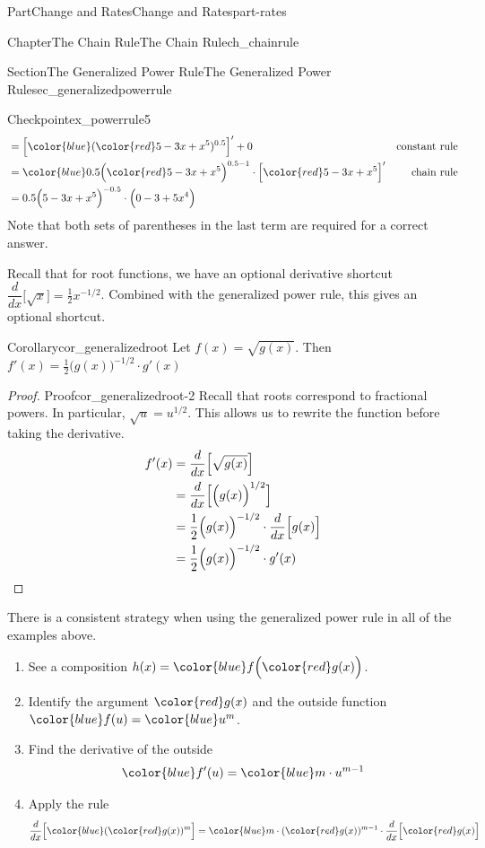\documentclass{tufte-book}
\numberwithin{equation}{chapter}
\newcommand{\qedhere}{\relax}
\newcommand{\red}[1]{   {\color{red}   #1}   }
\newcommand{\blue}[1]{  {\color{blue}  #1}  }
\newcommand{\ddx}[1]{ \dfrac{d}{dx} \Big[ #1 \Big]  }
\newcommand{\D}[1]{ \Big[ #1 \Big]'  }
\newcommand{\amp}{&}
\begin{document}
\begin{partptx}{Part}{Change and Rates}{}{Change and Rates}{}{}{part-rates}
\begin{chapterptx}{Chapter}{The Chain Rule}{}{The Chain Rule}{}{}{ch_chainrule}
\begin{sectionptx}{Section}{The Generalized Power Rule}{}{The Generalized Power Rule}{}{}{sec_generalizedpowerrule}
\begin{inlineexercise}{Checkpoint}{}{ex_powerrule5}
\begin{align*}
\amp =  \D{ \blue{(\red{5-3x+x^5})^{0.5}} }  + 0 \amp \text{constant  rule} \\
\amp = \blue{0.5 \Big(\red{5-3x+x^5}\Big)^{0.5-1}}\cdot\D{\red{5-3x+x^5}} \amp \text{chain rule} \\
\amp = 0.5 \Big( 5-3x+x^5 \Big)^{-0.5}\cdot\Big( 0-3+5x^4\Big) 
\end{align*}
Note that both sets of parentheses in the last term are required for a correct answer.%
\end{inlineexercise}%
Recall that for root functions, we have an optional derivative shortcut \(\ddx{\sqrt{x}}=\frac{1}{2}x^{-1/2}\).  Combined with the generalized power rule, this gives an optional shortcut.%
\begin{corollary}{Corollary}{}{}{cor_generalizedroot}%
Let \(f(x) = \sqrt{g(x)}\). Then \(f'(x) = \frac{1}{2} \Big(g(x)\Big)^{-1/2}\cdot g'(x)\)%
\end{corollary}
\begin{proof}{Proof}{}{cor_generalizedroot-2}
Recall that roots correspond to fractional powers.  In particular, \(\sqrt{u} = u^{1/2}\).  This allows us to rewrite the function before taking the derivative.%
\begin{align*}
f'(x) \amp = \ddx{\sqrt{g(x)}}\\
\amp = \ddx{\Big(g(x)\Big)^{1/2}} \\
\amp = \frac{1}{2} \Big(g(x)\Big)^{-1/2}\cdot \ddx{g(x)}\\
\amp = \frac{1}{2} \Big(g(x)\Big)^{-1/2}\cdot g'(x)\qedhere
\end{align*}
%
\end{proof}
There is a consistent strategy when using the generalized power rule in all of the examples above.%
\begin{enumerate}
\item{}See a composition \(h(x) = \blue{ f\Big(\red{g(x)}\Big) } \).%
\item{}Identify the argument \(\red{g(x)}\) and the outside function \(\blue{f(u)} = \blue{u^m}\).%
\item{}Find the derivative of the outside%
\begin{equation*}
\blue{f'(u)} = \blue{m\cdot u^{m-1}}
\end{equation*}
%
\item{}Apply the rule%
\begin{equation*}
\ddx{\blue{ ( \red{g(x)} )^{m} } } 
= \blue{ m\cdot ( \red{g(x)} )^{m-1} }\cdot \ddx{ \red{g(x)} }
\end{equation*}
%
\end{enumerate}

\end{sectionptx}
\end{chapterptx}
\end{partptx}
\end{document}
